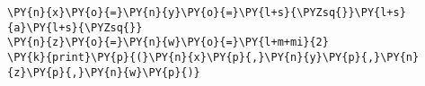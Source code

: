 \begin{Verbatim}[commandchars=\\\{\}]
\PY{n}{x}\PY{o}{=}\PY{n}{y}\PY{o}{=}\PY{l+s}{\PYZsq{}}\PY{l+s}{a}\PY{l+s}{\PYZsq{}}
\PY{n}{z}\PY{o}{=}\PY{n}{w}\PY{o}{=}\PY{l+m+mi}{2}
\PY{k}{print}\PY{p}{(}\PY{n}{x}\PY{p}{,}\PY{n}{y}\PY{p}{,}\PY{n}{z}\PY{p}{,}\PY{n}{w}\PY{p}{)}
\end{Verbatim}
